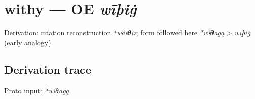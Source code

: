\documentclass[
  british,
  a4paper,
  openany]{book}
\providecommand{\texorpdfstring}[2]{#1}
\begin{document}
\section{\texorpdfstring{withy --- OE
\emph{wīþiġ}}{withy --- OE wīþiġ}}\label{withy-oe-wux12buxfeiux121}


Derivation: citation reconstruction \emph{*wáiθiz}; form followed here
\emph{*wī́θagą} \textgreater{} \emph{wīþiġ} (early analogy).

\subsection{Derivation trace}\label{derivation-trace-105}

Proto input: \emph{*wī́θagą}

\begingroup
\setlength{\fboxsep}{6pt}
\end{document}
